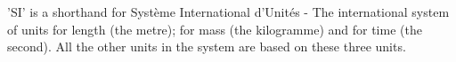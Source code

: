 'SI' is a shorthand for Syst\`eme International d'Unit\'es - The
international system of units for length (the metre); for mass (the
kilogramme) and for time (the second).
All the other units  in the system are based on these three units.